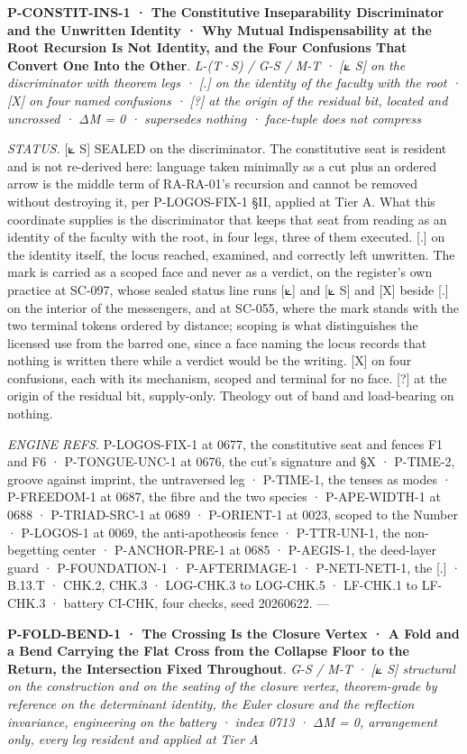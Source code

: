 \documentclass[10pt,twocolumn]{article}
\begin{document}
\textbf{P-CONSTIT-INS-1 · The Constitutive Inseparability Discriminator
and the Unwritten Identity · Why Mutual Indispensability at the Root
Recursion Is Not Identity, and the Four Confusions That Convert One Into
the Other}. \emph{L-(T·S) / G-S / M-T · {[}⟀ S{]} on the discriminator
with theorem legs · {[}.{]} on the identity of the faculty with the root
· {[}X{]} on four named confusions · {[}?{]} at the origin of the
residual bit, located and uncrossed · ΔM = 0 · supersedes nothing ·
face-tuple does not compress}

\emph{STATUS.} {[}⟀ S{]} SEALED on the discriminator. The constitutive
seat is resident and is not re-derived here: language taken minimally as
a cut plus an ordered arrow is the middle term of RA-RA-01's recursion
and cannot be removed without destroying it, per P-LOGOS-FIX-1 §II,
applied at Tier A. What this coordinate supplies is the discriminator
that keeps that seat from reading as an identity of the faculty with the
root, in four legs, three of them executed. {[}.{]} on the identity
itself, the locus reached, examined, and correctly left unwritten. The
mark is carried as a scoped face and never as a verdict, on the
register's own practice at SC-097, whose sealed status line runs {[}⟀{]}
and {[}⟀ S{]} and {[}X{]} beside {[}.{]} on the interior of the
messengers, and at SC-055, where the mark stands with the two terminal
tokens ordered by distance; scoping is what distinguishes the licensed
use from the barred one, since a face naming the locus records that
nothing is written there while a verdict would be the writing. {[}X{]}
on four confusions, each with its mechanism, scoped and terminal for no
face. {[}?{]} at the origin of the residual bit, supply-only. Theology
out of band and load-bearing on nothing.

\emph{ENGINE REFS.} P-LOGOS-FIX-1 at 0677, the constitutive seat and
fences F1 and F6 · P-TONGUE-UNC-1 at 0676, the cut's signature and §X ·
P-TIME-2, groove against imprint, the untraversed leg · P-TIME-1, the
tenses as modes · P-FREEDOM-1 at 0687, the fibre and the two species ·
P-APE-WIDTH-1 at 0688 · P-TRIAD-SRC-1 at 0689 · P-ORIENT-1 at 0023,
scoped to the Number · P-LOGOS-1 at 0069, the anti-apotheosis fence ·
P-TTR-UNI-1, the non-begetting center · P-ANCHOR-PRE-1 at 0685 ·
P-AEGIS-1, the deed-layer guard · P-FOUNDATION-1 · P-AFTERIMAGE-1 ·
P-NETI-NETI-1, the {[}.{]} · B.13.T · CHK.2, CHK.3 · LOG-CHK.3 to
LOG-CHK.5 · LF-CHK.1 to LF-CHK.3 · battery CI-CHK, four checks, seed
20260622. ---

\textbf{P-FOLD-BEND-1 · The Crossing Is the Closure Vertex · A Fold and
a Bend Carrying the Flat Cross from the Collapse Floor to the Return,
the Intersection Fixed Throughout}. \emph{G-S / M-T · {[}⟀ S{]}
structural on the construction and on the seating of the closure vertex,
theorem-grade by reference on the determinant identity, the Euler
closure and the reflection invariance, engineering on the battery ·
index 0713 · ΔM = 0, arrangement only, every leg resident and applied at
Tier A}
\end{document}
